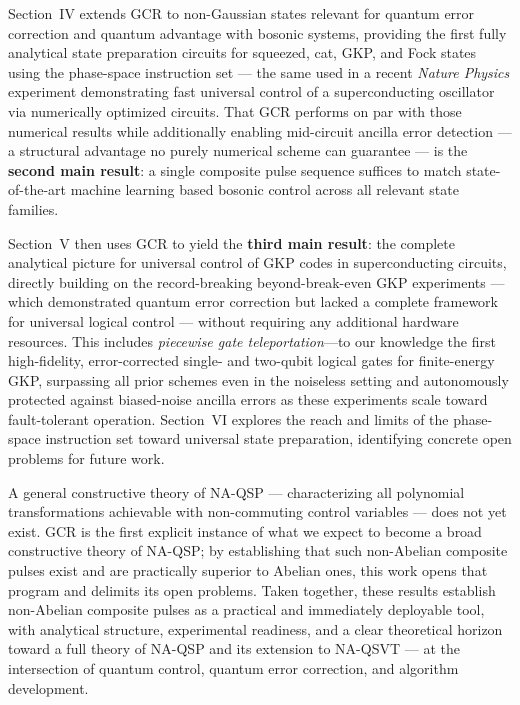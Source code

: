 \documentclass[11pt, letterpaper]{article}
\begin{document}
Section~IV extends GCR to non-Gaussian states relevant for quantum error correction and quantum advantage with bosonic systems, providing the first fully analytical state preparation circuits for squeezed, cat, GKP, and Fock states using the phase-space instruction set --- the same used in a recent \textit{Nature Physics} experiment demonstrating fast universal control of a superconducting oscillator via numerically optimized circuits. That GCR performs on par with those numerical results while additionally enabling mid-circuit ancilla error detection --- a structural advantage no purely numerical scheme can guarantee --- is the \textbf{second main result}: a single composite pulse sequence suffices to match state-of-the-art machine learning based bosonic control across all relevant state families.

Section~V then uses GCR to yield the \textbf{third main result}: the complete analytical picture for universal control of GKP codes in superconducting circuits, directly building on the record-breaking beyond-break-even GKP experiments --- which demonstrated quantum error correction but lacked a complete framework for universal logical control --- without requiring any additional hardware resources. This includes \emph{piecewise gate teleportation}---to our knowledge the first high-fidelity, error-corrected single- and two-qubit logical gates for finite-energy GKP, surpassing all prior schemes even in the noiseless setting and autonomously protected against biased-noise ancilla errors as these experiments scale toward fault-tolerant operation. Section~VI explores the reach and limits of the phase-space instruction set toward universal state preparation, identifying concrete open problems for future work.

A general constructive theory of NA-QSP --- characterizing all polynomial transformations achievable with non-commuting control variables --- does not yet exist. GCR is the first explicit instance of what we expect to become a broad constructive theory of NA-QSP; by establishing that such non-Abelian composite pulses exist and are practically superior to Abelian ones, this work opens that program and delimits its open problems. Taken together, these results establish non-Abelian composite pulses as a practical and immediately deployable tool, with analytical structure, experimental readiness, and a clear theoretical horizon toward a full theory of NA-QSP and its extension to NA-QSVT --- at the intersection of quantum control, quantum error correction, and algorithm development.
\end{document}
